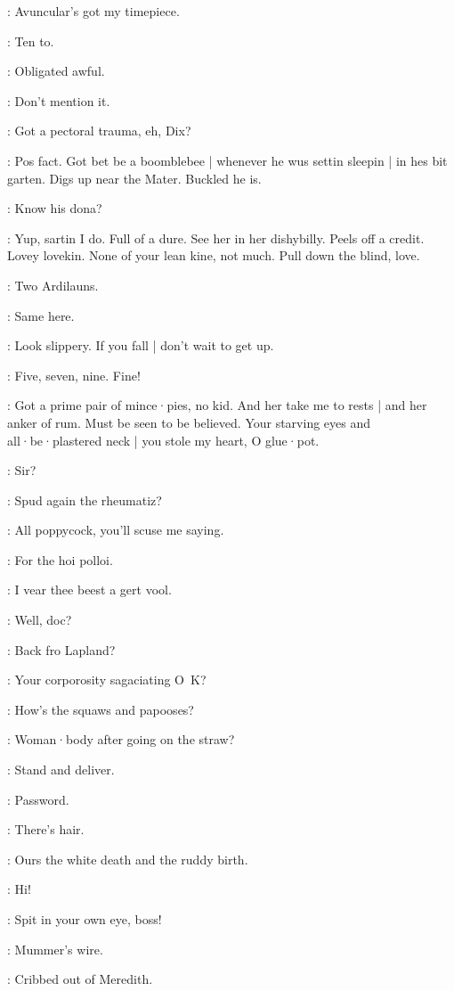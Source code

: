 \Bloom:
Avuncular's got my timepiece.

\madden:
Ten to.

\Bloom:
Obligated awful.

\madden:
Don't mention it.

\lynch:
Got a pectoral trauma,
eh,
Dix?

\dixon:
Pos fact.
Got bet be a boomblebee |
whenever he wus settin sleepin |
in hes bit garten.
Digs up near the Mater.
Buckled he is.

\lynch:
Know his dona?

\dixon:
Yup,
sartin I do.
Full of a dure.
See her in her dishybilly.
Peels off a credit.
Lovey lovekin.
None of your lean kine,
not much.
Pull down the blind,
love.

\madden:
Two Ardilauns.

\lynch:
Same here.

\Bloom:
Look slippery.
If you fall |
don't wait to get up.

\barman:
Five,
seven,
nine.
Fine!

\dixon:
Got a prime pair of mince·pies,
no kid.
And her take me to rests |
and her anker of rum.
Must be seen to be believed.
Your starving eyes and all·be·plastered neck |
you stole my heart,
O glue·pot.

\barman:
Sir?

\bannon:
Spud again the rheumatiz?

\mulligan:
All poppycock,
you'll scuse me saying.

\lynch:
For the hoi polloi.

\crotthers:
I vear thee beest a gert vool.

\punch:
Well,
doc?

\lynch:
Back fro Lapland?

\lenehan:
Your corporosity sagaciating O~K?

\bannon:
How's the squaws and papooses?

\dixon:
Woman·body after going on the straw?

\lenehan:
Stand and deliver.

\crotthers:
Password.

\punch:
There's hair.

\lenehan:
Ours the white death and the ruddy birth.

\dixon:
Hi!

\bannon:
Spit in your own eye,
boss!

\lenehan:
Mummer's wire.

\stephen:
Cribbed out of Meredith.

